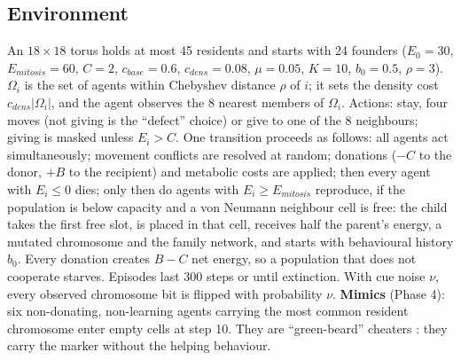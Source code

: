 \documentclass{article}
\begin{document}
\subsection{Environment}
An $18\times18$ torus holds at most 45 residents and starts with 24 founders ($E_0=30$, $E_{mitosis}=60$, $C=2$, $c_{base}=0.6$, $c_{dens}=0.08$, $\mu=0.05$, $K=10$, $b_0=0.5$, $\rho=3$). $\Omega_i$ is the set of agents within Chebyshev distance $\rho$ of $i$; it sets the density cost $c_{dens}|\Omega_i|$, and the agent observes the 8 nearest members of $\Omega_i$. Actions: stay, four moves (not giving is the ``defect'' choice) or give to one of the 8 neighbours; giving is masked unless $E_i>C$. One transition proceeds as follows: all agents act simultaneously; movement conflicts are resolved at random; donations ($-C$ to the donor, $+B$ to the recipient) and metabolic costs are applied; then every agent with $E_i\le0$ dies; only then do agents with $E_i\ge E_{mitosis}$ reproduce, if the population is below capacity and a von Neumann neighbour cell is free: the child takes the first free slot, is placed in that cell, receives half the parent's energy, a mutated chromosome and the family network, and starts with behavioural history $b_0$. Every donation creates $B-C$ net energy, so a population that does not cooperate starves. Episodes last 300 steps or until extinction. With cue noise $\nu$, every observed chromosome bit is flipped with probability $\nu$. \textbf{Mimics} (Phase 4): six non-donating, non-learning agents carrying the most common resident chromosome enter empty cells at step 10. They are ``green-beard'' cheaters \cite{dawkins1976}: they carry the marker without the helping behaviour.
\end{document}
